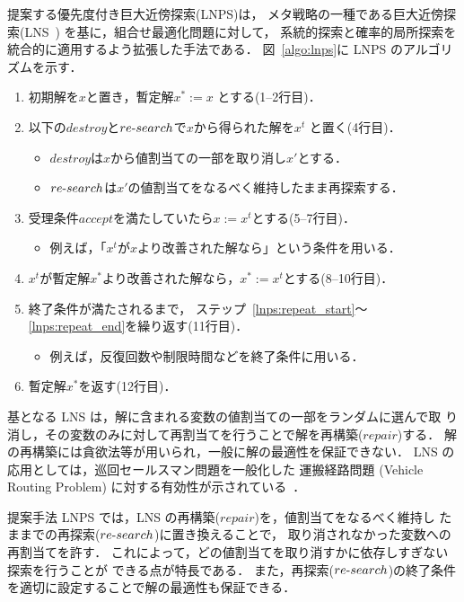 提案する優先度付き巨大近傍探索(LNPS)は，
メタ戦略の一種である巨大近傍探索(LNS~\cite{Pisinger10})
を基に，組合せ最適化問題に対して，
系統的探索と確率的局所探索を統合的に適用するよう拡張した手法である．
%
図~\ref{algo:lnps}に LNPS のアルゴリズムを示す．
\begin{enumerate}\compress
\item 初期解を$x$と置き，暫定解$x^{*} := x$ とする(1--2行目)．
\item \label{lnps:repeat_start}
  以下の$destroy$と$re\mathchar`-search$で$x$から得られた解を$x^{t}$
  と置く(4行目)．
  \begin{itemize}\compress
  \item $destroy$は$x$から値割当ての一部を取り消し$x'$とする．
  \item $re\mathchar`-search$は$x'$の値割当てをなるべく維持したまま再探索する．
  \end{itemize}
\item 受理条件$accept$を満たしていたら$x := x^{t}$とする(5--7行目)．
  \begin{itemize}\compress
  \item 例えば，「$x^{t}$が$x$より改善された解なら」という条件を用いる．
  \end{itemize}
\item \label{lnps:repeat_end}
  $x^{t}$が暫定解$x^{*}$より改善された解なら，$x^{*} := x^{t}$とする(8--10行目)．
\item 終了条件が満たされるまで，
  ステップ~\ref{lnps:repeat_start}〜\ref{lnps:repeat_end}を繰り返す(11行目)．
  \begin{itemize}\compress
  \item 例えば，反復回数や制限時間などを終了条件に用いる．
  \end{itemize}
\item 暫定解$x^{*}$を返す(12行目)．
\end{enumerate}

基となる LNS は，解に含まれる変数の値割当ての一部をランダムに選んで取
り消し，その変数のみに対して再割当てを行うことで解を再構築($repair$)する．
解の再構築には貪欲法等が用いられ，一般に解の最適性を保証できない．
LNS の応用としては，巡回セールスマン問題を一般化した
運搬経路問題 (Vehicle Routing Problem)
に対する有効性が示されている~\cite{Pisinger10}．

提案手法 LNPS では，LNS の再構築($repair$)を，値割当てをなるべく維持し
たままでの再探索($re\mathchar`-search$)に置き換えることで，
取り消されなかった変数への再割当てを許す．
これによって，どの値割当てを取り消すかに依存しすぎない探索を行うことが
できる点が特長である．
また，再探索($re\mathchar`-search$)の終了条件を適切に設定することで解の最適性も保証できる．


